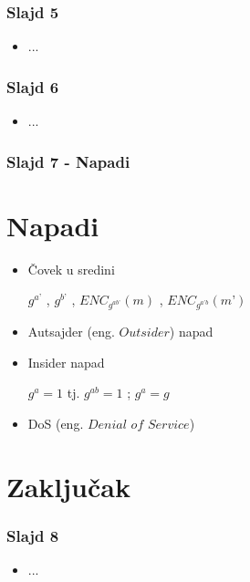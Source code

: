 \documentclass[14pt]{beamer}
\begin{document}
\begin{frame}[fragile]\frametitle{Slajd 5}
	\begin{itemize}	
		\item ...
	\end{itemize}
\end{frame}

\begin{frame}[fragile]\frametitle{Slajd 6}
	\begin{itemize}	
		\item ...
	\end{itemize}
\end{frame}

\begin{frame}[fragile]\frametitle{Slajd 7 - Napadi}
\section{Napadi}
	\begin{itemize}	
        \item Čovek u sredini 
        
        $g^{a’}$ , $g^{b’}$ , $ENC_{g^{ab’}} (m)$ , $ENC_{g^{a’b}} (m’)$
	\item Autsajder (eng. $Outsider$) napad
        \item Insider napad

        $g^{a} = 1$ tj. $g^{ab} = 1$ ; $g^a = g$
        \item DoS (eng. $Denial$ $of$ $Service$)
	\end{itemize}
\end{frame}

\section{Zaključak}

\begin{frame}[fragile]\frametitle{Slajd 8}
	\begin{itemize}	
		\item ...
	\end{itemize}
\end{frame}
\end{document}
